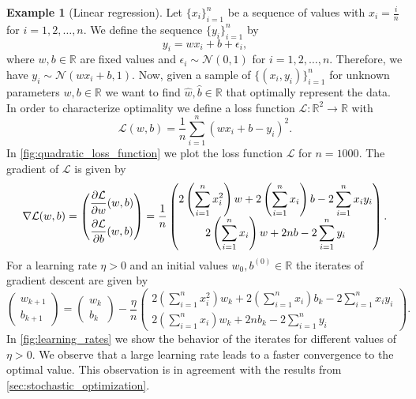 \documentclass[12pt]{article}
\theoremstyle{definition}
\newtheorem{example}[example]{Example}
\numberwithin{equation}{section}
\newcommand{\R}{\mathbb{R}}
\newcommand{\CL}{\mathcal{L}}
\newcommand{\CN}{\mathcal{N}}
\begin{document}
\begin{example}[Linear regression]
  \label{ex:linear_regression}
  Let $\{x_i\}_{i=1}^n$ be a sequence of values with $x_i = \frac{i}{n}$ for $i = 1,2,\dots,n$. We define the sequence $\{y_i\}_{i=1}^n$ by
  \begin{equation*}
    y_i = wx_i + b + \epsilon_i,
  \end{equation*}
  where $w,b \in \R$ are fixed values and $\epsilon_i \sim \CN(0,1)$ for $i = 1, 2, \dots, n$. Therefore, we have $y_i \sim \CN(wx_i + b,1)$.
  Now, given a sample of $\{(x_i, y_i)\}_{i=1}^n$ for unknown parameters $w, b \in \R$ we want to find $\hat{w}, \hat{b} \in \R$ that optimally represent the data. In order to characterize optimality we define a loss function $\CL : \R^2 \rightarrow \R$ with 
  \begin{equation}
    \CL (w, b) = \frac{1}{n} \sum_{i=1}^n(wx_i + b - y_i)^2.
  \end{equation}
  In \autoref{fig:quadratic_loss_function} we plot the loss function $\CL$ for $n = 1000$. The gradient of $\CL$ is given by
  \[
    \nabla \CL (w,b) = 
    \begin{pmatrix}
      \displaystyle\frac{\partial \CL}{\partial w}(w,b) \\
      \addlinespace
      \displaystyle\frac{\partial \CL}{\partial b}(w,b) 
    \end{pmatrix}
    = \frac{1}{n}
    \begin{pmatrix}
      2\left(\displaystyle\sum_{i=1}^n x_i^2\right)w + 2 \left(\displaystyle\sum_{i=1}^n x_i\right)b - 2 \displaystyle\sum_{i=1}^n x_i y_i \\
      2 \left(\displaystyle\sum_{i=1}^n x_i\right) w + 2nb - 2 \displaystyle\sum_{i=1}^n y_i
    \end{pmatrix}.
  \]
  For a learning rate $\eta > 0$ and an initial values $w_{0},b^{(0)} \in \R$ the iterates of gradient descent are given by
  \begin{equation}
    \begin{pmatrix}
      w_{k+1} \\
      b_{k+1}
    \end{pmatrix}
    =
    \begin{pmatrix}
      w_{k} \\
      b_k
    \end{pmatrix}
    - \frac{\eta}{n}
    \begin{pmatrix}
      2\left(\displaystyle\sum_{i=1}^n x_i^2\right)w_k + 2 \left(\displaystyle\sum_{i=1}^n x_i\right)b_k - 2 \displaystyle\sum_{i=1}^n x_i y_i \\
      2 \left(\displaystyle\sum_{i=1}^n x_i\right) w_k + 2nb_k - 2 \displaystyle\sum_{i=1}^n y_i
    \end{pmatrix}.
  \end{equation}
  In \autoref{fig:learning_rates} we show the behavior of the iterates for different values of $\eta >0$. We observe that a large learning rate leads to a faster convergence to the optimal value. This observation is in agreement with the results from \autoref{sec:stochastic_optimization}.


\end{example}
\end{document}
